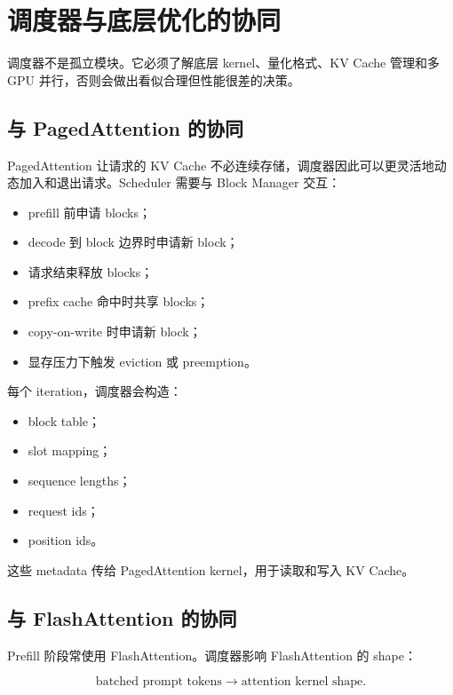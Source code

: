 \section{调度器与底层优化的协同}
\label{sec:scheduler-and-low-level-optimizations}

调度器不是孤立模块。它必须了解底层 kernel、量化格式、KV Cache 管理和多 GPU 并行，否则会做出看似合理但性能很差的决策。

\subsection{与 PagedAttention 的协同}
\label{subsec:scheduler-with-pagedattention}

PagedAttention 让请求的 KV Cache 不必连续存储，调度器因此可以更灵活地动态加入和退出请求。Scheduler 需要与 Block Manager 交互：

\begin{itemize}
\item prefill 前申请 blocks；
\item decode 到 block 边界时申请新 block；
\item 请求结束释放 blocks；
\item prefix cache 命中时共享 blocks；
\item copy-on-write 时申请新 block；
\item 显存压力下触发 eviction 或 preemption。
\end{itemize}

每个 iteration，调度器会构造：

\begin{itemize}
\item block table；
\item slot mapping；
\item sequence lengths；
\item request ids；
\item position ids。
\end{itemize}

这些 metadata 传给 PagedAttention kernel，用于读取和写入 KV Cache。

\subsection{与 FlashAttention 的协同}
\label{subsec:scheduler-with-flashattention}

Prefill 阶段常使用 FlashAttention。调度器影响 FlashAttention 的 shape：

\[
\text{batched prompt tokens}
\rightarrow
\text{attention kernel shape}.
\]

